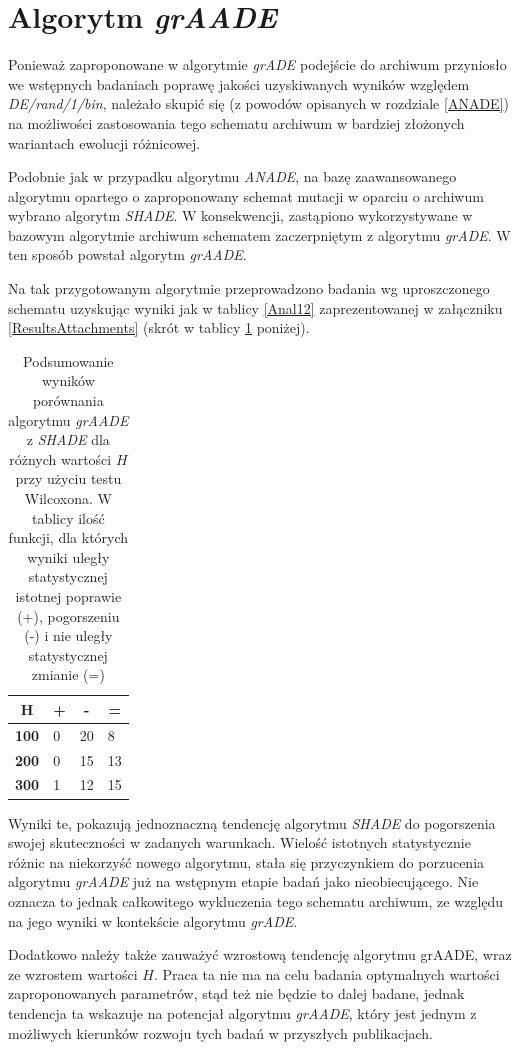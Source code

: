 \documentclass[12pt,a4paper]{report}
\begin{document}
{{{{{{{\section{Algorytm \emph{grAADE}}
\label{grAADE}
\par{
Ponieważ zaproponowane w algorytmie \emph{grADE} podejście do archiwum przyniosło we wstępnych badaniach poprawę jakości uzyskiwanych wyników względem \emph{DE/rand/1/bin}, należało skupić się (z powodów opisanych w rozdziale \ref{ANADE}) na możliwości zastosowania tego schematu archiwum w bardziej złożonych wariantach ewolucji różnicowej.
}
\par{
Podobnie jak w przypadku algorytmu \emph{ANADE}, na bazę zaawansowanego algorytmu opartego o zaproponowany schemat mutacji w oparciu o archiwum wybrano algorytm \emph{SHADE}. W konsekwencji, zastąpiono wykorzystywane w bazowym algorytmie archiwum schematem zaczerpniętym z algorytmu \emph{grADE}. W ten sposób powstał algorytm \emph{grAADE}.
}
\par{
Na tak przygotowanym algorytmie przeprowadzono badania wg uproszczonego schematu uzyskując wyniki jak w tablicy \ref{Anal12} zaprezentowanej w załączniku \ref{ResultsAttachments} (skrót w tablicy \ref{Anal12sum} poniżej).
}
\begin{table}[h]
\centering
\caption{Podsumowanie wyników porównania algorytmu \emph{grAADE} z \emph{SHADE} dla różnych wartości $H$ przy użyciu testu Wilcoxona. W tablicy ilość funkcji, dla których wyniki uległy statystycznej istotnej poprawie (+), pogorszeniu (-) i nie uległy statystycznej zmianie (=)}
\label{Anal12sum}
\begin{tabular}{|l|l|l|l|}
\hline
\multicolumn{1}{|c|}{{\bf H}} & \multicolumn{1}{c|}{{\bf +}} & \multicolumn{1}{c|}{{\bf -}} & \multicolumn{1}{c|}{{\bf =}} \\ \hline
{\bf 100} & 0 & 20 & 8  \\ \hline
{\bf 200} & 0 & 15 & 13 \\ \hline
{\bf 300} & 1 & 12 & 15 \\ \hline
\end{tabular}
\end{table}

\par{
Wyniki te, pokazują jednoznaczną tendencję algorytmu \emph{SHADE} do pogorszenia swojej skuteczności w zadanych warunkach. Wielość istotnych statystycznie różnic na niekorzyść nowego algorytmu, stała się przyczynkiem do porzucenia algorytmu \emph{grAADE} już na wstępnym etapie badań jako nieobiecującego. Nie oznacza to jednak całkowitego wykluczenia tego schematu archiwum, ze względu na jego wyniki w kontekście algorytmu \emph{grADE}.
}
\par{
Dodatkowo należy także zauważyć wzrostową tendencję algorytmu grAADE, wraz ze wzrostem wartości $H$. Praca ta nie ma na celu badania optymalnych wartości zaproponowanych parametrów, stąd też nie będzie to dalej badane, jednak tendencja ta wskazuje na potencjał algorytmu \emph{grAADE}, który jest jednym z możliwych kierunków rozwoju tych badań w przyszłych publikacjach.
}

}}}}}}}
\end{document}
